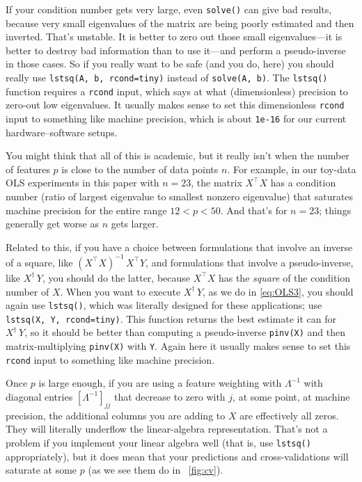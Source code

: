 \documentclass[12pt,letterpaper]{article}
\newcommand{\code}[1]{\texttt{#1}}
\begin{document}
If your condition number gets very large, even \code{solve()} can give bad results, because very small eigenvalues of the matrix are being poorly estimated and then inverted.
That's unstable.
It is better to zero out those small eigenvalues---it is better to destroy bad information than to use it---and perform a pseudo-inverse in those cases.
So if you really want to be safe (and you do, here) you should really use \code{lstsq(A, b, rcond=tiny)} instead of \code{solve(A, b)}.
The \code{lstsq()} function requires a \code{rcond} input, which says at what (dimensionless) precision to zero-out low eigenvalues.
It usually makes sense to set this dimensionless \code{rcond} input to something like machine precision, which is about \code{1e-16} for our current hardware--software setups.

You might think that all of this is academic, but it really isn't when the number of features $p$ is close to the number of data points $n$.
For example, in our toy-data OLS experiments in this paper with $n=23$, the matrix $X^\top X$ has a condition number (ratio of largest eigenvalue to smallest nonzero eigenvalue) that saturates machine precision for the entire range $12 < p < 50$.
And that's for $n=23$; things generally get worse as $n$ gets larger.

Related to this, if you have a choice between formulations that involve an inverse of a square, like $(X^\top X)^{-1}\,X^\top Y$, and formulations that involve a pseudo-inverse, like $X^\dagger\,Y$, you should do the latter, because $X^\top X$ has the \emph{square} of the condition number of $X$.
When you want to execute $X^\dagger\,Y$, as we do in \eqref{eq:OLS3}, you should again use \code{lstsq()}, which was literally designed for these applications; use \code{lstsq(X, Y, rcond=tiny)}.
This function returns the best estimate it can for $X^\dagger\,Y$, so
it should be better than computing a pseudo-inverse \code{pinv(X)} and then matrix-multiplying \code{pinv(X)} with \code{Y}.
Again here it usually makes sense to set this \code{rcond} input to something like machine precision.

Once $p$ is large enough, if you are using a feature weighting with $\Lambda^{-1}$ with diagonal entries $[\Lambda^{-1}]_{jj}$ that decrease to zero with $j$, at some point, at machine precision, the additional columns you are adding to $X$ are effectively all zeros.
They will literally underflow the linear-algebra representation.
That's not a problem if you implement your linear algebra well (that is, use \code{lstsq()} appropriately), but it does mean that your predictions and cross-validations will saturate at some $p$ (as we see them do in \figurename~\ref{fig:cv}).
\end{document}

